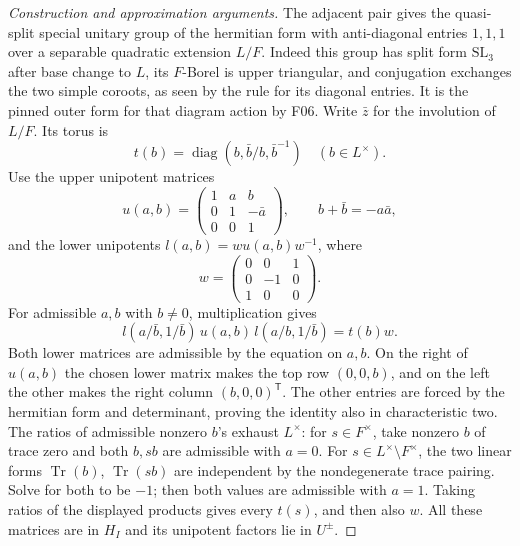 \documentclass[11pt,a4paper,openany,oneside]{book}
\theoremstyle{resultstyle}
\theoremstyle{definition}
\numberwithin{equation}{chapter}
\newcommand{\SL}{\mathrm{SL}}
\begin{document}
\begin{proof}[Construction and approximation arguments]
The adjacent pair gives the quasi-split special unitary
group of the hermitian form with anti-diagonal entries
\(1,1,1\) over a separable quadratic extension \(L/F\).
Indeed this group has split form \(\SL_3\) after base
change to \(L\), its \(F\)-Borel is upper triangular,
and conjugation exchanges the two simple coroots, as
seen by the rule for its diagonal entries. It is the
pinned outer form for that diagram action by F06.
Write \(\bar z\) for the involution of \(L/F\). Its torus
is
\[
 t(b)=\operatorname{diag}(b,\bar b/b,\bar b^{-1})
 \quad(b\in L^\times).
\]
Use the upper unipotent matrices
\[
 u(a,b)=\begin{pmatrix}1&a&b\\0&1&-\bar a\\0&0&1\end{pmatrix},
 \qquad b+\bar b=-a\bar a,
\]
and the lower unipotents \(l(a,b)=w u(a,b)w^{-1}\), where
\[
 w=\begin{pmatrix}0&0&1\\0&-1&0\\1&0&0\end{pmatrix}.
\]
For admissible \(a,b\) with \(b\ne0\), multiplication gives
\[
 l(a/\bar b,1/\bar b)\,u(a,b)\,l(a/b,1/\bar b)=t(b)w.
\]
Both lower matrices are admissible by the equation on
\(a,b\). On the right of \(u(a,b)\) the chosen lower
matrix makes the top row \((0,0,b)\), and on the left the
other makes the right column \((b,0,0)^{\mathsf T}\).
The other entries are forced by the hermitian form and
determinant, proving the identity also in characteristic
two. The ratios of admissible nonzero \(b\)'s exhaust
\(L^\times\): for \(s\in F^\times\), take nonzero \(b\) of
trace zero and both \(b,sb\) are admissible with \(a=0\).
For \(s\in L^\times\setminus F^\times\), the two linear
forms \(\operatorname{Tr}(b)\), \(\operatorname{Tr}(sb)\)
are independent by the nondegenerate trace pairing.
Solve for both to be \(-1\); then both values are
admissible with \(a=1\). Taking ratios of the displayed
products gives every \(t(s)\), and then also \(w\).
All these matrices are in \(H_I\) and its unipotent
factors lie in \(U^\pm\).


\end{proof}
\end{document}
